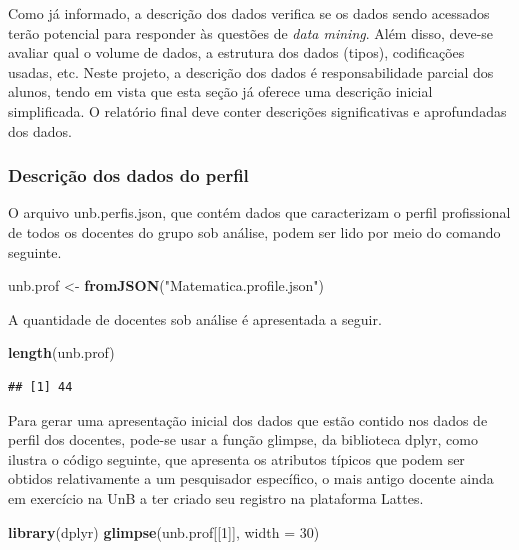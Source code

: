\documentclass[]{article}
\newenvironment{Shaded}{\begin{snugshade}}{\end{snugshade}}
\newcommand{\KeywordTok}[1]{\textcolor[rgb]{0.13,0.29,0.53}{\textbf{#1}}}
\newcommand{\DataTypeTok}[1]{\textcolor[rgb]{0.13,0.29,0.53}{#1}}
\newcommand{\DecValTok}[1]{\textcolor[rgb]{0.00,0.00,0.81}{#1}}
\newcommand{\StringTok}[1]{\textcolor[rgb]{0.31,0.60,0.02}{#1}}
\newcommand{\NormalTok}[1]{#1}
\begin{document}
Como já informado, a descrição dos dados verifica se os dados sendo
acessados terão potencial para responder às questões de \emph{data
mining}. Além disso, deve-se avaliar qual o volume de dados, a estrutura
dos dados (tipos), codificações usadas, etc. Neste projeto, a descrição
dos dados é responsabilidade parcial dos alunos, tendo em vista que esta
seção já oferece uma descrição inicial simplificada. O relatório final
deve conter descrições significativas e aprofundadas dos dados.

\subsubsection{Descrição dos dados do
perfil}\label{descricao-dos-dados-do-perfil}

O arquivo unb.perfis.json, que contém dados que caracterizam o perfil
profissional de todos os docentes do grupo sob análise, podem ser lido
por meio do comando seguinte.

\begin{Shaded}
\begin{Highlighting}[]
\NormalTok{unb.prof <-}\StringTok{ }\KeywordTok{fromJSON}\NormalTok{(}\StringTok{"Matematica.profile.json"}\NormalTok{)}
\end{Highlighting}
\end{Shaded}

A quantidade de docentes sob análise é apresentada a seguir.

\begin{Shaded}
\begin{Highlighting}[]
\KeywordTok{length}\NormalTok{(unb.prof)}
\end{Highlighting}
\end{Shaded}

\begin{verbatim}
## [1] 44
\end{verbatim}

Para gerar uma apresentação inicial dos dados que estão contido nos
dados de perfil dos docentes, pode-se usar a função glimpse, da
biblioteca dplyr, como ilustra o código seguinte, que apresenta os
atributos típicos que podem ser obtidos relativamente a um pesquisador
específico, o mais antigo docente ainda em exercício na UnB a ter criado
seu registro na plataforma Lattes.

\begin{Shaded}
\begin{Highlighting}[]
\KeywordTok{library}\NormalTok{(dplyr) }
\KeywordTok{glimpse}\NormalTok{(unb.prof[[}\DecValTok{1}\NormalTok{]], }\DataTypeTok{width =} \DecValTok{30}\NormalTok{)}
\end{Highlighting}
\end{Shaded}
\end{document}
